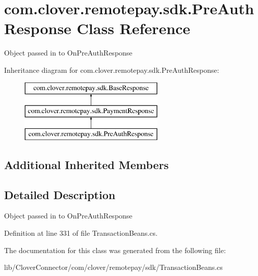 \hypertarget{classcom_1_1clover_1_1remotepay_1_1sdk_1_1_pre_auth_response}{}\section{com.\+clover.\+remotepay.\+sdk.\+Pre\+Auth\+Response Class Reference}
\label{classcom_1_1clover_1_1remotepay_1_1sdk_1_1_pre_auth_response}


Object passed in to On\+Pre\+Auth\+Response  


Inheritance diagram for com.\+clover.\+remotepay.\+sdk.\+Pre\+Auth\+Response\+:\begin{figure}[H]
\begin{center}
\leavevmode
\includegraphics[height=3.000000cm]{classcom_1_1clover_1_1remotepay_1_1sdk_1_1_pre_auth_response}
\end{center}
\end{figure}
\subsection*{Additional Inherited Members}


\subsection{Detailed Description}
Object passed in to On\+Pre\+Auth\+Response 



Definition at line 331 of file Transaction\+Beans.\+cs.



The documentation for this class was generated from the following file\+:\begin{DoxyCompactItemize}
\item 
lib/\+Clover\+Connector/com/clover/remotepay/sdk/Transaction\+Beans.\+cs\end{DoxyCompactItemize}
